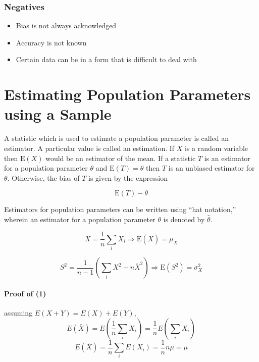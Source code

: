 \documentclass{article}
\begin{document}
\subsubsection{Negatives}

\begin{itemize}

    \item Bias is not always acknowledged
    \item Accuracy is not known
    \item Certain data can be in a form that is difficult to deal with

\end{itemize}

\section{Estimating Population Parameters using a Sample}

A statistic which is used to estimate a population parameter is called an estimator. A particular value is called an estimation. If $X$ is a random variable then $\textrm{E}(X)$ would be an estimator of the mean. If a statistic $T$ is an estimator for a population parameter $\theta$ and $\textrm{E}(T)=\theta$ then $T$ is an unbiased estimator for $\theta$. Otherwise, the bias of $T$ is given by the expression

\[\textrm{E}(T)-\theta\]

\noindent Estimators for population parameters can be written using ``hat notation,'' wherein an estimator for a population parameter $\theta$ is denoted by $\hat{\theta}$.

\begin{equation}\bar{X}=\frac{1}{n}\sum_iX_i\Rightarrow \textrm{E}(\bar{X})=\mu_X\end{equation}

\begin{equation}S^2=\frac{1}{n-1}\left(\sum_iX^2-n\bar{X}^2\right)\Rightarrow\textrm{E}(S^2)=\sigma_X^2\end{equation}

\paragraph{Proof of (1)} assuming $E(X+Y)=E(X)+E(Y)$,
\[E(\bar{X})=E\left(\frac{1}{n}\sum_iX_i\right)=\frac{1}{n}E\left(\sum_iX_i\right)\]
\[E(\bar{X})=\frac{1}{n}\sum_iE(X_i)=\frac{1}{n}n\mu=\mu\]
\end{document}
